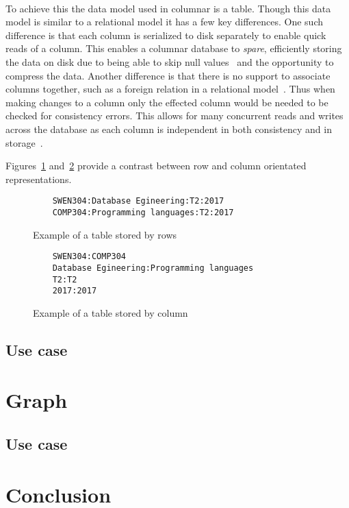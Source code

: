 \documentclass{CRPITStyle}
\renewcommand{\cite}{\citep}
\begin{document}
\paragraph{}
To achieve this the data model used in columnar is a table.
Though this data model is similar to a relational model it has a few key
differences.
One such difference is that each column is serialized to disk separately to enable
quick reads of a column.
This enables a columnar database to \textit{spare}, efficiently storing
the data on disk due to being able to skip null values~\cite{bigtable} and the
opportunity to compress the data.
Another difference is that there is no support to associate columns together,
such as a foreign relation in a relational model~\cite{relational_db,nosql_survey}.
Thus when making changes to a column only the effected column would be needed
to be checked for consistency errors.
This allows for many concurrent reads and writes across the database as each
column is independent in both consistency and in storage~\cite{nosql_survey}.


Figures~\ref{lst:row} and~\ref{lst:column} provide a contrast between
row and column orientated representations.

\begin{figure}
\begin{verbatim}
    SWEN304:Database Egineering:T2:2017
    COMP304:Programming languages:T2:2017
\end{verbatim}
\caption{Example of a table stored by rows}
\label{lst:row}
\end{figure}

\begin{figure}
\begin{verbatim}
    SWEN304:COMP304
    Database Egineering:Programming languages
    T2:T2
    2017:2017
\end{verbatim}
\caption{Example of a table stored by column}
\label{lst:column}
\end{figure}

\cite{usingcolumn}

\subsection{Use case}

\cite{nosql_performance}
\cite{bigtable}


\section{Graph}

\subsection{Use case}

\cite{nosql_performance}

\section{Conclusion}



\end{document}
